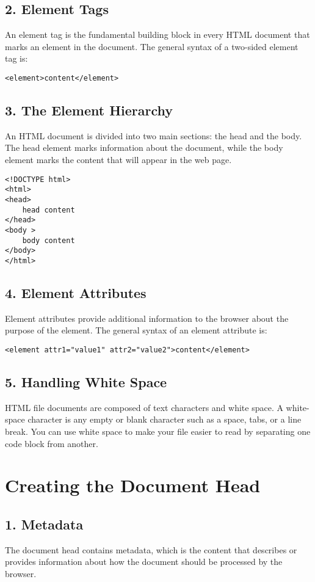 \documentclass{article}
\begin{document}
\subsection*{2. Element Tags}
An element tag is the fundamental building block in every HTML document that marks an element in the document. The general syntax of a two-sided element tag is:
\begin{lstlisting}
<element>content</element>
\end{lstlisting}

\subsection*{3. The Element Hierarchy}
An HTML document is divided into two main sections: the head and the body. The head element marks information about the document, while the body element marks the content that will appear in the web page.

\begin{lstlisting}
<!DOCTYPE html>
<html>
<head>
    head content
</head>
<body >
    body content
</body>
</html>
\end{lstlisting}

\subsection*{4. Element Attributes}
Element attributes provide additional information to the browser about the purpose of the element. The general syntax of an element attribute is:
\begin{lstlisting}
<element attr1="value1" attr2="value2">content</element>
\end{lstlisting}

\subsection*{5. Handling White Space}
HTML file documents are composed of text characters and white space. A white-space character is any empty or blank character such as a space, tabs, or a line break. You can use white space to make your file easier to read by separating one code block from another.

\section{Creating the Document Head}
\subsection*{1. Metadata}
The document head contains metadata, which is the content that describes or provides information about how the document should be processed by the browser.
\end{document}
